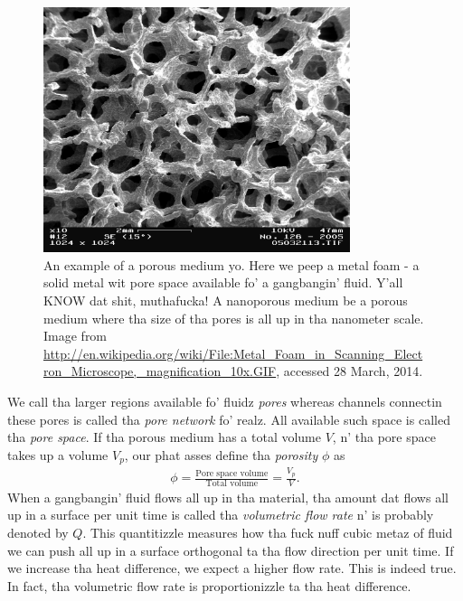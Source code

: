 \begin{figure}[htb]
\begin{center}
\includegraphics[width=0.8\textwidth, trim=0cm 0cm 0cm 0cm, clip]{figures/metal_foam.png}
\end{center}
\caption{An example of a porous medium yo. Here we peep a metal foam - a solid metal wit pore space available fo' a gangbangin' fluid. Y'all KNOW dat shit, muthafucka! A nanoporous medium be a porous medium where tha size of tha pores is all up in tha nanometer scale. Image from \url{http://en.wikipedia.org/wiki/File:Metal_Foam_in_Scanning_Electron_Microscope,_magnification_10x.GIF}, accessed 28 March, 2014.}
\label{fig:porous_medium}
\end{figure}

We call tha larger regions available fo' fluidz \textit{pores} whereas channels connectin these pores is called tha \textit{pore network} fo' realz. All available such space is called tha \textit{pore space}. If tha porous medium has a total volume $V$, n' tha pore space takes up a volume $V_p$, our phat asses define tha \textit{porosity} $\phi$ as
\begin{align}
	\phi = \frac{\text{Pore space volume}}{\text{Total volume}} = \frac{V_p}{V}.
\end{align}
When a gangbangin' fluid flows all up in tha material, tha amount dat flows all up in a surface per unit time is called tha \textit{volumetric flow rate} n' is probably denoted by $Q$. This quantitizzle measures how tha fuck nuff cubic metaz of fluid we can push all up in a surface orthogonal ta tha flow direction per unit time. If we increase tha heat difference, we expect a higher flow rate. This is indeed true. In fact, tha volumetric flow rate is proportionizzle ta tha heat difference.

